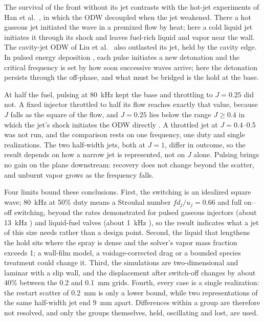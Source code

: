 \documentclass[aip,pof,preprint,amsmath,amssymb]{revtex4-2}
\begin{document}
The survival of the front without its jet contrasts with the hot-jet experiments of Han et al.\ \cite{Han2012hotjet}, in which the ODW decoupled when the jet weakened. There a hot gaseous jet initiated the wave in a premixed flow by heat; here a cold liquid jet initiates it through its shock and leaves fuel-rich liquid and vapor near the wall. The cavity-jet ODW of Liu et al.\ \cite{Liu2026cavity} also outlasted its jet, held by the cavity edge. In pulsed energy deposition \cite{Jiang2025energy}, each pulse initiates a new detonation and the critical frequency is set by how soon successive waves arrive; here the detonation persists through the off-phase, and what must be bridged is the hold at the base.

At half the fuel, pulsing at 80~kHz kept the base and throttling to $J = 0.25$ did not. A fixed injector throttled to half its flow reaches exactly that value, because $J$ falls as the square of the flow, and $J = 0.25$ lies below the range $J \ge 0.4$ in which the jet's shock initiates the ODW directly \cite{Wang2026ast}. A throttled jet at $J = 0.4$--0.5 was not run, and the comparison rests on one frequency, one duty and single realizations. The two half-width jets, both at $J = 1$, differ in outcome, so the result depends on how a narrow jet is represented, not on $J$ alone. Pulsing brings no gain on the plane downstream: recovery does not change beyond the scatter, and unburnt vapor grows as the frequency falls.

Four limits bound these conclusions. First, the switching is an idealized square wave; 80~kHz at 50\% duty means a Strouhal number $f d_j/u_j = 0.66$ and full on--off switching, beyond the rates demonstrated for pulsed gaseous injectors (about 13~kHz \cite{Cutler2001}) and liquid-fuel valves (about 1~kHz \cite{Lovett2008}), so the result indicates what a jet of this size needs rather than a design point. Second, the liquid that lengthens the hold sits where the spray is dense and the solver's vapor mass fraction exceeds 1; a wall-film model, a voidage-corrected drag or a bounded species treatment could change it. Third, the simulations are two-dimensional and laminar with a slip wall, and the displacement after switch-off changes by about 40\% between the 0.2 and 0.1~mm grids. Fourth, every case is a single realization: the restart scatter of 0.2~mm is only a lower bound, while two representations of the same half-width jet end 9~mm apart. Differences within a group are therefore not resolved, and only the groups themselves, held, oscillating and lost, are used.
\end{document}
